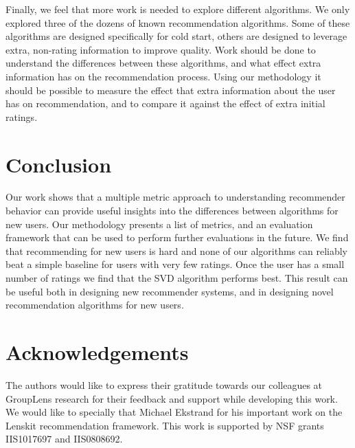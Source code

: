 \documentclass[letterpaper]{sig-alternate}
\begin{document}
  Finally, we feel that more work is needed to explore different algorithms.
  We only explored three of the dozens of known recommendation algorithms.
  Some of these algorithms are designed specifically for cold start, others are designed to leverage extra, non-rating information to improve quality.
  Work should be done to understand the differences between these algorithms, and what effect extra information has on the recommendation process.
  Using our methodology it should be possible to measure the effect that extra information about the user has on recommendation, and to compare it against the effect of extra initial ratings.



\section{Conclusion}

  Our work shows that a multiple metric approach to understanding recommender behavior can provide useful insights into the differences between algorithms for new users.
  Our methodology presents a list of metrics, and an evaluation framework that can be used to perform further evaluations in the future.
  We find that recommending for new users is hard and none of our algorithms can reliably beat a simple baseline for users with very few ratings.
  Once the user has a small number of ratings we find that the SVD algorithm performs best.
  This result can be useful both in designing new recommender systems, and in designing novel recommendation algorithms for new users.


\section{Acknowledgements}
  
  The authors would like to express their gratitude towards our colleagues at GroupLens research for their feedback and support while developing this work.
  We would like to specially that Michael Ekstrand for his  important work on the Lenskit recommendation framework.
  This work is supported by NSF grants IIS1017697 and IIS0808692.


\end{document}
